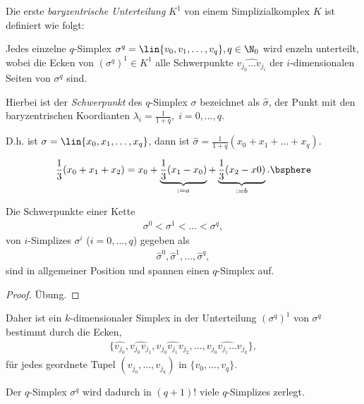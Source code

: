 \begin{defn}
\label{defn:4.2.2}
Die erste \emph{baryzentrische Unterteilung} $K^1$ von einem Simplizialkomplex $K$ ist
definiert wie folgt:

Jedes einzelne $q$-Simplex $\sigma^q = \lin{v_0,v_1,\ldots,v_q}, q\in\N_0$ wird
enzeln unterteilt, wobei die Ecken von $(\sigma^q)^1\in K^1$ alle Schwerpunkte
$\widehat{v_{j_0}\ldots v_{j_i}}$ der $i$-dimensionalen Seiten von $\sigma^q$
sind.

Hierbei ist der \emph{Schwerpunkt} des $q$-Simplex $\sigma$ bezeichnet als
$\hat{\sigma}$, der Punkt mit den baryzentrischen Koordianten $\lambda_i=
\frac{1}{1+q},\; i=0,\ldots,q$.

D.h. ist $\sigma =\lin{x_0,x_1,\ldots,x_q}$, dann ist $\hat{\sigma} =
\frac{1}{1+q}(x_0+x_1+\ldots+x_q)$.\fishhere
\end{defn}
\begin{bspn}
\begin{align*}
\frac{1}{3}(x_0+x_1+x_2) = x_0+ \underbrace{\frac{1}{3}(x_1-x_0)}_{:=a} +
\underbrace{\frac{1}{3}(x_2-x0)}_{:=b}.\bsphere
\end{align*}
\end{bspn}

\begin{propn}
Die Schwerpunkte einer Kette
\begin{align*}
\sigma^0 < \sigma^1 < \ldots <\sigma^q,
\end{align*}
von $i$-Simplizes $\sigma^i$ ($i=0,\ldots,q$) gegeben als
\begin{align*}
\hat{\sigma}^0, \hat{\sigma}^1, \ldots, \hat{\sigma}^q,
\end{align*}
sind in allgemeiner Position und spannen einen $q$-Simplex auf.\fishhere
\end{propn}
\begin{proof}
Übung.\qedhere
\end{proof}

Daher ist ein $k$-dimensionaler Simplex in der Unterteilung $(\sigma^q)^1$ von
$\sigma^q$ bestimmt durch die Ecken,
\begin{align*}
\{\widehat{v_{j_0}}, \widehat{v_{j_0}v_{j_1}},
\widehat{v_{j_0}v_{j_1}v_{j_2}},\ldots,\widehat{v_{j_0}v_{j_1}\ldots v_{j_k}}\},
\end{align*}
für jedes geordnete Tupel $(v_{j_0}, \ldots, v_{j_k})$ in $\{v_0,\ldots,v_q\}$.

Der $q$-Simplex $\sigma^q$ wird dadurch in $(q+1)!$ viele $q$-Simplizes zerlegt.

